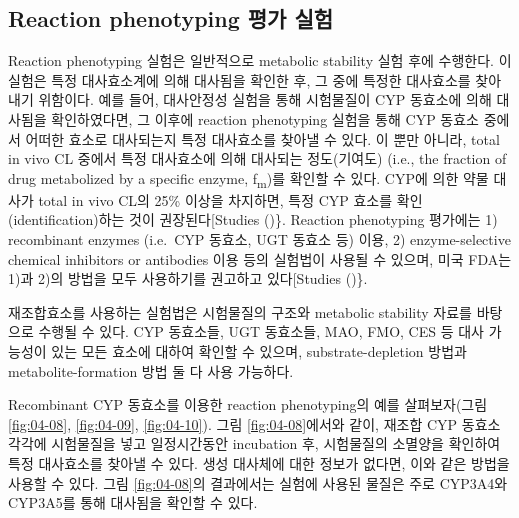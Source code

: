 \documentclass[
  11pt,
  krantz2, a4paper, twoside]{krantz}
\begin{document}
\subsection{Reaction phenotyping 평가 실험}\label{reaction-phenotyping-uxd3c9uxac00-uxc2e4uxd5d8}

Reaction phenotyping 실험은 일반적으로 metabolic stability 실험 후에
수행한다. 이 실험은 특정 대사효소계에 의해 대사됨을 확인한 후, 그 중에
특정한 대사효소를 찾아내기 위함이다. 예를 들어, 대사안정성 실험을 통해
시험물질이 CYP 동효소에 의해 대사됨을 확인하였다면, 그 이후에 reaction
phenotyping 실험을 통해 CYP 동효소 중에서 어떠한 효소로 대사되는지 특정
대사효소를 찾아낼 수 있다. 이 뿐만 아니라, total in vivo CL 중에서 특정
대사효소에 의해 대사되는 정도(기여도) (i.e., the fraction of drug
metabolized by a specific enzyme, f\textsubscript{m})를 확인할 수 있다. CYP에 의한
약물 대사가 total in vivo CL의 25\% 이상을 차지하면, 특정 CYP 효소를
확인(identification)하는 것이 권장된다{[}Studies ()\}. Reaction phenotyping
평가에는 1) recombinant enzymes (i.e.~CYP 동효소, UGT 동효소 등) 이용,
2) enzyme-selective chemical inhibitors or antibodies 이용 등의 실험법이
사용될 수 있으며, 미국 FDA는 1)과 2)의 방법을 모두 사용하기를 권고하고
있다{[}Studies ()\}.

재조합효소를 사용하는 실험법은 시험물질의 구조와 metabolic stability
자료를 바탕으로 수행될 수 있다. CYP 동효소들, UGT 동효소들, MAO, FMO,
CES 등 대사 가능성이 있는 모든 효소에 대하여 확인할 수 있으며,
substrate-depletion 방법과 metabolite-formation 방법 둘 다 사용
가능하다.

Recombinant CYP 동효소를 이용한 reaction phenotyping의 예를
살펴보자(그림 \ref{fig:04-08}, \ref{fig:04-09}, \ref{fig:04-10}). 그림 \ref{fig:04-08}에서와 같이, 재조합 CYP 동효소 각각에
시험물질을 넣고 일정시간동안 incubation 후, 시험물질의 소멸양을 확인하여
특정 대사효소를 찾아낼 수 있다. 생성 대사체에 대한 정보가 없다면, 이와
같은 방법을 사용할 수 있다. 그림 \ref{fig:04-08}의 결과에서는 실험에 사용된 물질은
주로 CYP3A4와 CYP3A5를 통해 대사됨을 확인할 수 있다.
\end{document}
